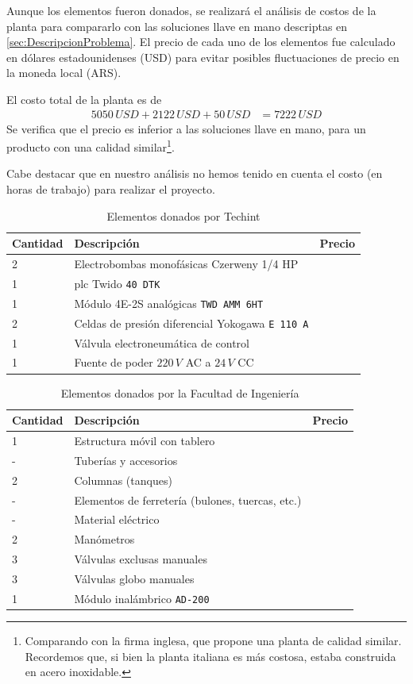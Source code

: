 Aunque los elementos fueron donados, se realizará el análisis de costos de la
planta para compararlo con las soluciones llave en mano descriptas en
\ref{sec:DescripcionProblema}.
El precio de cada uno de los elementos fue calculado en dólares estadounidenses
(USD) para evitar posibles fluctuaciones de precio en la moneda local (ARS).

El costo total de la planta es de
\begin{align}
5050\,USD + 2122\,USD + 50\,USD &= 7222\,USD
\end{align}
Se verifica que el precio es inferior a las soluciones llave en mano, para un
producto con una calidad similar\footnote{Comparando con la firma inglesa,
que propone una planta de calidad similar. Recordemos que, si bien la planta
italiana es más costosa, estaba construida en acero inoxidable.}.

Cabe destacar que en nuestro análisis no hemos tenido en cuenta el costo (en
horas de trabajo) para realizar el proyecto.
\begin{table}[!t]
\renewcommand{\arraystretch}{1.3}
\centering
\begin{tabularx}{\textwidth}{l||X||l}
\hline
\bfseries Cantidad & \bfseries Descripción &\bfseries Precio\\
\hline \hline
2& Electrobombas monofásicas Czerweny 1/4 HP &
 {\multirow{6}{*}{5050 USD}}\\
1& \gls{plc} Twido \texttt{40 DTK} &  \\
1& Módulo 4E-2S analógicas \texttt{TWD AMM 6HT}& \\
2& Celdas de presión diferencial Yokogawa \texttt{E 110 A}& \\
1& Válvula electroneumática de control & \\
1& Fuente de poder $220\,V$ AC a $24\,V$ CC& \\
\hline
\end{tabularx}
\caption{Elementos donados por Techint}
\label{tab:donacionTechint}
\end{table}

\begin{table}[!t]
\renewcommand{\arraystretch}{1.3}
\centering
\begin{tabularx}{\textwidth}{l||X||l}
\hline
\bfseries Cantidad & \bfseries Descripción & \bfseries Precio\\
\hline \hline
1& Estructura móvil con tablero&
 {\multirow{9}{*}{2122 USD}}\\
-& Tuberías y accesorios &  \\
2& Columnas (tanques) &  \\
-& Elementos de ferretería (bulones, tuercas, etc.)& \\
-& Material eléctrico &\\
2& Manómetros& \\
3& Válvulas exclusas manuales& \\
3& Válvulas globo manuales& \\
1& Módulo inalámbrico \texttt{AD-200}&\\
\hline
\end{tabularx}
\caption{Elementos donados por la Facultad de Ingeniería}
\label{tab:donacionFing}
\end{table}

